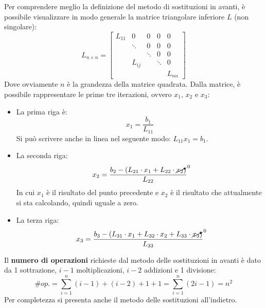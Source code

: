 \noindent
Per comprendere meglio la definizione del metodo di sostituzioni in avanti, è possibile visualizzare in modo generale la matrice triangolare inferiore $L$ (non singolare):
\begin{equation*}
    L_{n \times n} = \begin{bmatrix}
        L_{11} & 0 & 0 & 0 & 0 \\
         & \ddots & 0 & 0 & 0 \\
         & & \ddots & 0 & 0 \\
         & L_{ij} & & \ddots & 0 \\
         & & & & L_{nn}
    \end{bmatrix}
\end{equation*}
Dove ovviamente $n$ è la grandezza della matrice quadrata. Dalla matrice, è possibile rappresentare le prime tre iterazioni, ovvero $x_{1}$, $x_{2}$ e $x_{3}$:
\begin{itemize}
    \item La prima riga è:
    \begin{equation*}
        x_{1} = \dfrac{
            b_{1}
        }{
            L_{11}
        }
    \end{equation*}
    Si può scrivere anche in linea nel seguente modo: $L_{11}x_{1} = b_{1}$.

    \item La seconda riga:
    \begin{equation*}
        x_{2} = \dfrac{
            b_{2} - (L_{21} \cdot x_{1} + L_{22}  \cdot \cancelto{0}{x_{2}})
        }{
            L_{22}
        }
    \end{equation*}
    In cui $x_{1}$ è il risultato del punto precedente e $x_{2}$ è il risultato che attualmente si sta calcolando, quindi uguale a zero.

    \item La terza riga:
    \begin{equation*}
        x_{3} = \dfrac{
            b_{3} - (L_{31} \cdot x_{1} + L_{32} \cdot x_{2} + L_{33} \cdot \cancelto{0}{x_{3}})
        }{
            L_{33}
        }
    \end{equation*}
\end{itemize}

\noindent
Il \textbf{numero di operazioni} richieste dal metodo delle sostituzioni in avanti è dato da 1 sottrazione, $i-1$ moltiplicazioni, $i-2$ addizioni e 1 divisione:
\begin{equation}
    \# op. = \displaystyle\sum_{i=1}^{n} \left(i-1\right) + \left(i-2\right) + 1 + 1 = \sum_{i=1}^{n} \left(2i-1\right) = n^{2}
\end{equation}
Per completezza si presenta anche il metodo delle sostituzioni all'indietro.


